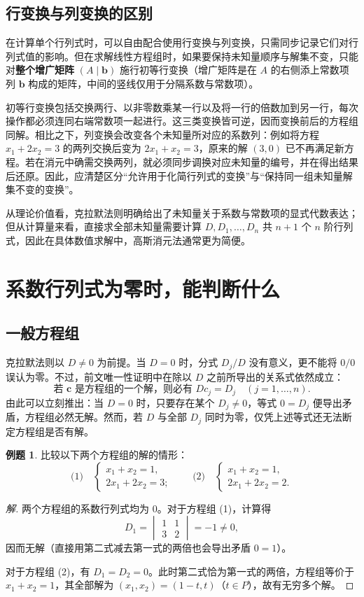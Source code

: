\documentclass[UTF8, fontset=fandol, a4paper, 12pt]{ctexart}
\theoremstyle{definition}
\newtheorem{example}[definition]{例题}
\begin{document}
\subsection{行变换与列变换的区别}

在计算单个行列式时，可以自由配合使用行变换与列变换，只需同步记录它们对行列式值的影响。但在求解线性方程组时，如果要保持未知量顺序与解集不变，只能对\textbf{整个增广矩阵} $(A\mid\boldsymbol b)$ 施行初等行变换（增广矩阵是在 $A$ 的右侧添上常数项列 $\boldsymbol b$ 构成的矩阵，中间的竖线仅用于分隔系数与常数项）。

初等行变换包括交换两行、以非零数乘某一行以及将一行的倍数加到另一行，每次操作都必须连同右端常数项一起进行。这三类变换皆可逆，因而变换前后的方程组同解。相比之下，列变换会改变各个未知量所对应的系数列：例如将方程 $x_1+2x_2=3$ 的两列交换后变为 $2x_1+x_2=3$，原来的解 $(3,0)$ 已不再满足新方程。若在消元中确需交换两列，就必须同步调换对应未知量的编号，并在得出结果后还原。因此，应清楚区分“允许用于化简行列式的变换”与“保持同一组未知量解集不变的变换”。

从理论价值看，克拉默法则明确给出了未知量关于系数与常数项的显式代数表达；但从计算量来看，直接求全部未知量需要计算 $D,D_1,\ldots,D_n$ 共 $n+1$ 个 $n$ 阶行列式，因此在具体数值求解中，高斯消元法通常更为简便。

\section{系数行列式为零时，能判断什么}

\subsection{一般方程组}

克拉默法则以 $D\ne0$ 为前提。当 $D=0$ 时，分式 $D_j/D$ 没有意义，更不能将 $0/0$ 误认为零。不过，前文唯一性证明中在除以 $D$ 之前所导出的关系式依然成立：
\[
 \text{若 $\boldsymbol c$ 是方程组的一个解，则必有 }Dc_j=D_j\quad(j=1,\ldots,n).
\]
由此可以立刻推出：当 $D=0$ 时，只要存在某个 $D_j\ne0$，等式 $0=D_j$ 便导出矛盾，方程组必然无解。然而，若 $D$ 与全部 $D_j$ 同时为零，仅凭上述等式还无法断定方程组是否有解。

\begin{example}
比较以下两个方程组的解的情形：
\[
 \text{(1)}\quad
 \begin{cases}x_1+x_2=1,\\2x_1+2x_2=3;\end{cases}
 \qquad
 \text{(2)}\quad
 \begin{cases}x_1+x_2=1,\\2x_1+2x_2=2.\end{cases}
\]
\end{example}
\begin{proof}[解]
两个方程组的系数行列式均为 $0$。对于方程组 (1)，计算得
\[
 D_1=\begin{vmatrix}1&1\\3&2\end{vmatrix}=-1\ne0,
\]
因而无解（直接用第二式减去第一式的两倍也会导出矛盾 $0=1$）。

对于方程组 (2)，有 $D_1=D_2=0$。此时第二式恰为第一式的两倍，方程组等价于 $x_1+x_2=1$，其全部解为 $(x_1,x_2)=(1-t,t)$（$t\in P$），故有无穷多个解。
\end{proof}
\end{document}
